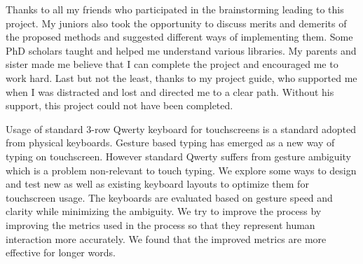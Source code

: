 \documentclass[MTech]{iitmdiss}
\begin{document}
Thanks to all my friends who participated in the brainstorming leading to this project. My juniors also took the opportunity to discuss merits and demerits of the proposed methods and suggested different ways of implementing them. Some PhD scholars taught and helped me understand various libraries. My parents and sister made me believe that I can complete the project and encouraged me to work hard. Last but not the least, thanks to my project guide, who supported me when I was distracted and lost and directed me to a clear path. Without his support, this project could not have been completed.


\abstract
\noindent Usage of standard 3-row Qwerty keyboard for touchscreens is a standard adopted from physical keyboards. Gesture based typing has emerged as a new way of typing on touchscreen. However standard Qwerty suffers from gesture ambiguity which is a problem non-relevant to touch typing. We explore some ways to design and test new as well as existing keyboard layouts to optimize them for touchscreen usage. The keyboards are evaluated based on gesture speed and clarity while minimizing the ambiguity. We try to improve the process by improving the metrics used in the process so that they represent human interaction more accurately. We found that the improved metrics are more effective for longer words.

\pagebreak


\begin{singlespace}
\tableofcontents
\thispagestyle{empty}

\listoffigures
{}
\end{singlespace}



\end{document}

